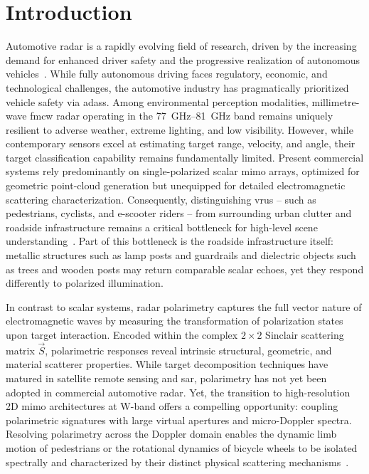\chapter{Introduction}
\label{chap:introduction}

Automotive radar is a rapidly evolving field of research, driven by the increasing demand for enhanced driver safety and the progressive realization of autonomous vehicles~\parencite{waldschmidtAutomotiveRadarFirst2021}.
While fully autonomous driving faces regulatory, economic, and technological challenges, the automotive industry has pragmatically prioritized vehicle safety via \glspl{adas}.
Among environmental perception modalities, millimetre-wave \gls{fmcw} radar operating in the \qtyrange{77}{81}{\giga\hertz} band remains uniquely resilient to adverse weather, extreme lighting, and low visibility.
However, while contemporary sensors excel at estimating target range, velocity, and angle, their target classification capability remains fundamentally limited.
Present commercial systems rely predominantly on single-polarized scalar \gls{mimo} arrays, optimized for geometric point-cloud generation but unequipped for detailed electromagnetic scattering characterization.
Consequently, distinguishing \glspl{vru} -- such as pedestrians, cyclists, and e-scooter riders -- from surrounding urban clutter and roadside infrastructure remains a critical bottleneck for high-level scene understanding~\parencite{tillyRoadUserClassification2021}.
Part of this bottleneck is the roadside infrastructure itself: metallic structures such as lamp posts and guardrails and dielectric objects such as trees and wooden posts may return comparable scalar echoes, yet they respond differently to polarized illumination.

In contrast to scalar systems, radar polarimetry captures the full vector nature of electromagnetic waves by measuring the transformation of polarization states upon target interaction.
Encoded within the complex $2 \times 2$ Sinclair scattering matrix $\vec S$, polarimetric responses reveal intrinsic structural, geometric, and material scatterer properties.
While target decomposition techniques have matured in satellite remote sensing and \gls{sar}, polarimetry has not yet been adopted in commercial automotive radar.
Yet, the transition to high-resolution 2D \gls{mimo} architectures at W-band offers a compelling opportunity: coupling polarimetric signatures with large virtual apertures and micro-Doppler spectra.
Resolving polarimetry across the Doppler domain enables the dynamic limb motion of pedestrians or the rotational dynamics of bicycle wheels to be isolated spectrally and characterized by their distinct physical scattering mechanisms~\parencite{bouwmeesterClassificationDynamicVulnerable2025}.

